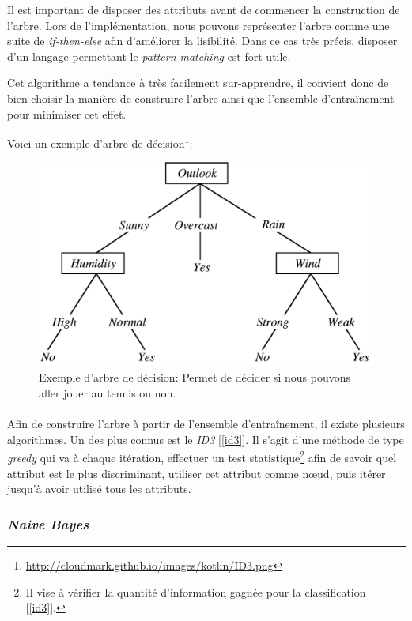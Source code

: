 \documentclass[a4paper, 11pt]{article}
\begin{document}
Il est important de disposer des attributs avant de commencer la construction de l'arbre. Lors de l'implémentation, nous pouvons représenter l'arbre comme une suite de \textit{if-then-else} afin d'améliorer la lisibilité. Dans ce cas très précis, disposer d'un langage permettant le \textit{pattern matching} est fort utile.

Cet algorithme a tendance à très facilement sur-apprendre, il convient donc de bien choisir la manière de construire l'arbre ainsi que l'ensemble d'entraînement pour minimiser cet effet. 

Voici un exemple d'arbre de décision\footnote{\url{http://cloudmark.github.io/images/kotlin/ID3.png}}:
\begin{figure}[h!]
\centering
\includegraphics{images/exemple_tree}
\caption{Exemple d'arbre de décision: Permet de décider si nous pouvons aller jouer au tennis ou non.}
\end{figure}

\paragraph{}
Afin de construire l'arbre à partir de l'ensemble d'entraînement, il existe plusieurs algorithmes. Un des plus connus est le \textit{ID3} [\ref{id3}]. Il s'agit d'une méthode de type \textit{greedy} qui va à chaque itération, effectuer un test statistique\footnote{Il vise à vérifier la quantité d'information gagnée pour la classification [\ref{id3}].} afin de savoir quel attribut est le plus discriminant, utiliser cet attribut comme nœud, puis itérer jusqu'à avoir utilisé tous les attributs.


\subsubsection{\textit{Naive Bayes}}
\end{document}
